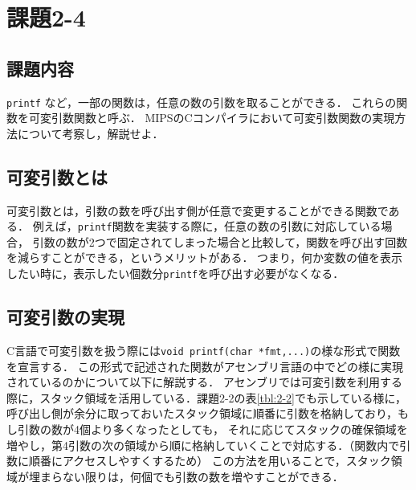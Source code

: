 \documentclass[a4j,11pt]{jarticle}
\begin{document}
\section{課題2-4}
\subsection{課題内容}

{\tt printf} など，一部の関数は，任意の数の引数を取ることができる．
これらの関数を可変引数関数と呼ぶ．
MIPSのCコンパイラにおいて可変引数関数の実現方法について考察し，解説せよ．

\subsection{可変引数とは}

可変引数とは，引数の数を呼び出す側が任意で変更することができる関数である．
例えば，{\tt printf}関数を実装する際に，任意の数の引数に対応している場合，
引数の数が2つで固定されてしまった場合と比較して，関数を呼び出す回数を減らすことができる，というメリットがある．
つまり，何か変数の値を表示したい時に，表示したい個数分{\tt printf}を呼び出す必要がなくなる．

\subsection{可変引数の実現}

C言語で可変引数を扱う際には{\tt void printf(char *fmt,...)}の様な形式で関数を宣言する．
この形式で記述された関数がアセンブリ言語の中でどの様に実現されているのかについて以下に解説する．
アセンブリでは可変引数を利用する際に，スタック領域を活用している．課題2-2の表\ref{tbl:2-2}でも示している様に，
呼び出し側が余分に取っておいたスタック領域に順番に引数を格納しており，もし引数の数が4個より多くなったとしても，
それに応じてスタックの確保領域を増やし，第4引数の次の領域から順に格納していくことで対応する．（関数内で引数に順番にアクセスしやすくするため）
この方法を用いることで，スタック領域が埋まらない限りは，何個でも引数の数を増やすことができる．
\end{document}
